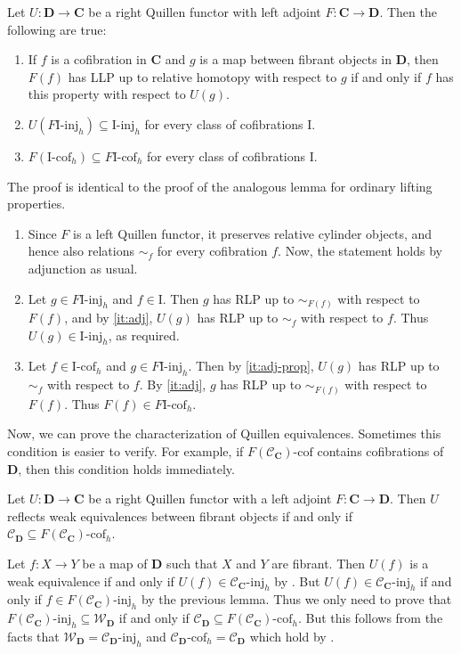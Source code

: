 \documentclass{tac}
\theoremstyle{definition}
\newcommand{\we}{\mathcal{W}}
\newcommand{\cof}{\mathcal{C}}
\newcommand{\cat}[1]{\mathbf{#1}}
\newcommand{\C}{\cat{C}}
\newcommand{\D}{\cat{D}}
\newcommand{\I}{\mathrm{I}}
\newcommand{\class}[2]{#1\text{-}\mathrm{#2}}
\newcommand{\Iinj}[1][\I]{\class{#1}{inj}}
\newcommand{\Icof}[1][\I]{\class{#1}{cof}}
\begin{document}
\begin{lem}
Let $U : \D \to \C$ be a right Quillen functor with left adjoint $F : \C \to \D$.
Then the following are true:
\begin{enumerate}
\item \label{it:adj} If $f$ is a cofibration in $\C$ and $g$ is a map between fibrant objects in $\D$,
then $F(f)$ has LLP up to relative homotopy with respect to $g$ if and only if $f$ has this property with respect to $U(g)$.
\item \label{it:adj-prop} $U(\Iinj[F\I]_h) \subseteq \Iinj_h$ for every class of cofibrations $\I$.
\item $F(\Icof_h) \subseteq \Icof[F\I]_h$ for every class of cofibrations $\I$.
\end{enumerate}
\end{lem}
\proof
The proof is identical to the proof of the analogous lemma for ordinary lifting properties.
\begin{enumerate}
\item Since $F$ is a left Quillen functor, it preserves relative cylinder objects, and hence also relations $\sim_f$ for every cofibration $f$.
Now, the statement holds by adjunction as usual.
\item Let $g \in \Iinj[F\I]_h$ and $f \in \I$.
Then $g$ has RLP up to $\sim_{F(f)}$ with respect to $F(f)$, and by \eqref{it:adj}, $U(g)$ has RLP up to $\sim_f$ with respect to $f$.
Thus $U(g) \in \Iinj_h$, as required.
\item Let $f \in \Icof_h$ and $g \in \Iinj[F\I]_h$.
Then by \eqref{it:adj-prop}, $U(g)$ has RLP up to $\sim_f$ with respect to $f$.
By \eqref{it:adj}, $g$ has RLP up to $\sim_{F(f)}$ with respect to $F(f)$.
Thus $F(f) \in \Icof[F\I]_h$.
\end{enumerate}
\endproof

Now, we can prove the characterization of Quillen equivalences.
Sometimes this condition is easier to verify.
For example, if $\Icof[F(\cof_\C)]$ contains cofibrations of $\D$, then this condition holds immediately.

\begin{prop}
Let $U : \D \to \C$ be a right Quillen functor with a left adjoint $F : \C \to \D$.
Then $U$ reflects weak equivalences between fibrant objects if and only if $\cof_\D \subseteq \Icof[F(\cof_\C)]_h$.
\end{prop}
\proof
Let $f : X \to Y$ be a map of $\D$ such that $X$ and $Y$ are fibrant.
Then $U(f)$ is a weak equivalence if and only if $U(f) \in \Iinj[\cof_\C]_h$ by .
But $U(f) \in \Iinj[\cof_\C]_h$ if and only if $f \in \Iinj[F(\cof_\C)]_h$ by the previous lemma.
Thus we only need to prove that $\Iinj[F(\cof_\C)]_h \subseteq \we_\D$ if and only if $\cof_\D \subseteq \Icof[F(\cof_\C)]_h$.
But this follows from the facts that $\we_\D = \Iinj[\cof_\D]_h$ and $\Icof[\cof_\D]_h = \cof_\D$ which hold by .
\endproof
\end{document}
